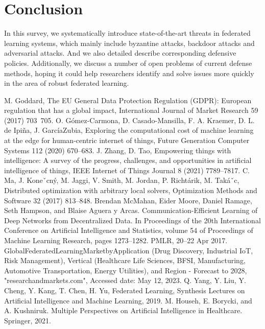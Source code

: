 \documentclass[conference]{IEEEtran}
\begin{document}
\section{Conclusion}
In this survey, we systematically introduce state-of-the-art threats in federated learning systems,
which mainly include byzantine attacks, backdoor attacks and adversarial attacks. 
And we also detailed describe corresponding defensive policies.
Additionally, we discuss a number of open problems of current defense methods,
hoping it could help researchers identify and solve issues more quickly in the area of robust federated learning.


\newpage

\begin{thebibliography}{00}
     M. Goddard, The EU General Data Protection Regulation (GDPR): European regulation that has a global impact, International Journal of Market Research 59 (2017) 703~705.
     O. Gómez-Carmona, D. Casado-Mansilla, F. A. Kraemer, D. L. de Ipiña, J. GarcíaZubia, Exploring the computational cost of machine learning at the edge for human-centric internet of things, Future Generation Computer Systems 112 (2020) 670–683.
     J. Zhang, D. Tao, Empowering things with intelligence: A survey of the progress, challenges, and opportunities in artificial intelligence of things, IEEE Internet of Things Journal 8 (2021) 7789–7817.
     C. Ma, J. Koneˇcný, M. Jaggi, V. Smith, M. Jordan, P. Richtárik, M. Takáˇc, Distributed optimization with arbitrary local solvers, Optimization Methods and Software 32 (2017) 813–848.
     Brendan McMahan, Eider Moore, Daniel Ramage, Seth Hampson, and Blaise Aguera y Arcas. Communication-Efficient Learning of Deep Networks from Decentralized Data. In Proceedings of the 20th International Conference on Artificial Intelligence and Statistics, volume 54 of Proceedings of Machine Learning Research, pages 1273–1282. PMLR, 20–22 Apr 2017.
     GlobalFederatedLearningMarketbyApplication (Drug Discovery, Industrial IoT, Risk Management), Vertical (Healthcare  Life Sciences, BFSI, Manufacturing, Automotive Transportation, Energy  Utilities), and Region - Forecast to 2028, "researchandmarkets.com", Accessed date: May 12, 2023.
     Q. Yang, Y. Liu, Y. Cheng, Y. Kang, T. Chen, H. Yu, Federated Learning, Synthesis Lectures on Artificial Intelligence and Machine Learning, 2019.
     M. Househ, E. Borycki, and A. Kushniruk. Multiple Perspectives on Artificial Intelligence in Healthcare. Springer, 2021.

\end{thebibliography}
\end{document}
